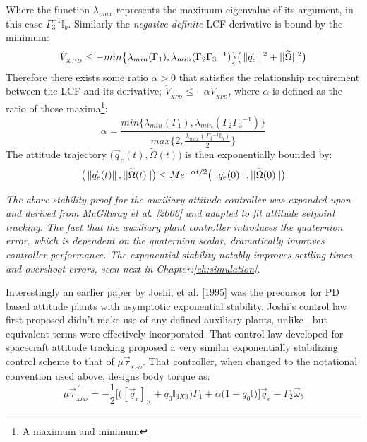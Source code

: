 {\begin{equation}
\end{equation}
Where the function $\lambda_{max}$ represents the maximum eigenvalue of its argument, in this case $\Gamma_3^{-1}\mathbb{I}_b$. Similarly the \emph{negative definite} LCF derivative is bound by the minimum:
\begin{equation}
\dot{V}_{_{XPD}} \leq -min \big\{ \lambda_{min}(\Gamma_1),\lambda_{min}(\Gamma_2\Gamma_3\text{}^{-1})\big\}\big(\left\lVert\vec{q}_e\right\rVert\text{}^2+||\widetilde{\Omega}||^2 \big)
\end{equation}
Therefore there exists some ratio $\alpha>0$ that satisfies the relationship requirement between the LCF and its derivative; $\dot{V}_{_{XPD}}\leq -\alpha V_{_{XPD}}$, where $\alpha$ is defined as the ratio of those maxima\footnote{A maximum and minimum}:
\begin{equation}
\alpha=\frac{min\big\{\lambda_{min}(\Gamma_1),\lambda_{min}(\Gamma_2\Gamma_3\text{}^{-1})\big\}}{max\big\{2,\frac{\lambda_{max}(\Gamma_3\text{}^{-1}\mathbb{I}_b)}{2}\big\}}
\end{equation}
The attitude trajectory $\big(\vec{q}_e(t),\widetilde{\Omega}(t)\big)$ is then exponentially bounded by:
\begin{equation}
\big(\left\lVert\vec{q}_e(t)\right\rVert,||\widetilde{\Omega}(t)||\big)\leq Me^{-\alpha t/2}\big(\left\lVert\vec{q}_e(0)\right\rVert,||\widetilde{\Omega}(0)||\big)
\end{equation}
\par
\vspace{-10pt}
\emph{\color{Gray}The above stability proof for the auxiliary attitude controller was expanded upon and derived from McGilvray et al. [2006]\cite{attitudestabilization} and adapted to fit attitude setpoint tracking. The fact that the auxiliary plant controller introduces the quaternion error, which is dependent on the quaternion scalar, dramatically improves controller performance. The exponential stability notably improves settling times and overshoot errors, seen next in Chapter:\ref{ch:simulation}.}
\par
Interestingly an earlier paper by Joshi, et al. [1995]\cite{robustattitude} was the precursor for PD based attitude plants with asymptotic exponential stability. Joshi's control law first proposed didn't make use of any defined auxiliary plants, unlike \cite{attitudestabilization}, but equivalent terms were effectively incorporated. That control law developed for spacecraft attitude tracking proposed a very similar exponentially stabilizing control scheme to that of $\mu\vec{\tau}_{_{XPD}}$. That controller, when changed to the notational convention used above, designs body torque as:
\begin{equation}
\mu\vec{\tau}^{\hspace{3pt}'}_{_{XPD}}=-\frac{1}{2}\Big[\big([\vec{q}_e]_\times+q_0\mathbb{I}_{3X3}\big)\Gamma_1+\alpha\big(1-q_0\mathbb{I}\big)\Big]\vec{q}_e-\Gamma_2\vec{\omega}_b
\end{equation} 
}

